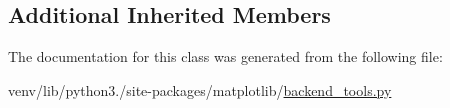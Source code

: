 \subsection*{Additional Inherited Members}


The documentation for this class was generated from the following file\+:\begin{DoxyCompactItemize}
\item 
venv/lib/python3./site-\/packages/matplotlib/\hyperlink{backend__tools_8py}{backend\+\_\+tools.\+py}\end{DoxyCompactItemize}
